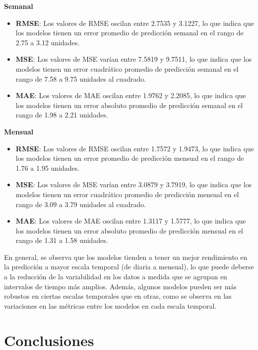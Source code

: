 \documentclass[
  11pt,
  bookmarksnumbered]{article}
\begin{document}
\textbf{Semanal}

\begin{itemize}
\item
  \textbf{RMSE}: Los valores de RMSE oscilan entre 2.7535 y 3.1227, lo que indica que los modelos tienen un error promedio de predicción semanal en el rango de 2.75 a 3.12 unidades.
\item
  \textbf{MSE}: Los valores de MSE varían entre 7.5819 y 9.7511, lo que indica que los modelos tienen un error cuadrático promedio de predicción semanal en el rango de 7.58 a 9.75 unidades al cuadrado.
\item
  \textbf{MAE}: Los valores de MAE oscilan entre 1.9762 y 2.2085, lo que indica que los modelos tienen un error absoluto promedio de predicción semanal en el rango de 1.98 a 2.21 unidades.
\end{itemize}

\textbf{Mensual}

\begin{itemize}
\item
  \textbf{RMSE}: Los valores de RMSE oscilan entre 1.7572 y 1.9473, lo que indica que los modelos tienen un error promedio de predicción mensual en el rango de 1.76 a 1.95 unidades.
\item
  \textbf{MSE}: Los valores de MSE varían entre 3.0879 y 3.7919, lo que indica que los modelos tienen un error cuadrático promedio de predicción mensual en el rango de 3.09 a 3.79 unidades al cuadrado.
\item
  \textbf{MAE}: Los valores de MAE oscilan entre 1.3117 y 1.5777, lo que indica que los modelos tienen un error absoluto promedio de predicción mensual en el rango de 1.31 a 1.58 unidades.
\end{itemize}

En general, se observa que los modelos tienden a tener un mejor rendimiento en la predicción a mayor escala temporal (de diaria a mensual), lo que puede deberse a la reducción de la variabilidad en los datos a medida que se agrupan en intervalos de tiempo más amplios.
Además, algunos modelos pueden ser más robustos en ciertas escalas temporales que en otras, como se observa en las variaciones en las métricas entre los modelos en cada escala temporal.

\hypertarget{conclusiones}{%
\section{Conclusiones}\label{conclusiones}}
\end{document}
